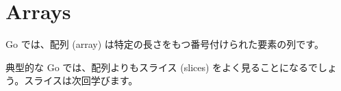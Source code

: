 \section{Arrays}


Go では、配列 (array) は特定の長さをもつ番号付けられた要素の列です。




典型的な Go では、配列よりもスライス (slices) をよく見ることになるでしょう。スライスは次回学びます。